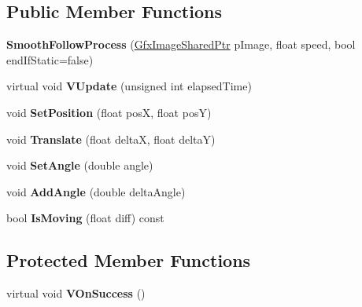 \subsection*{Public Member Functions}
\begin{DoxyCompactItemize}
\item 
\hypertarget{classSmoothFollowProcess_a22d54ebdcc739ba25941fc8c33248fd8}{{\bfseries Smooth\-Follow\-Process} (\hyperlink{GfxImage_8h_a42b2baf6110731a1a358d365e303e086}{Gfx\-Image\-Shared\-Ptr} p\-Image, float speed, bool end\-If\-Static=false)}\label{classSmoothFollowProcess_a22d54ebdcc739ba25941fc8c33248fd8}

\item 
\hypertarget{classSmoothFollowProcess_af9c4972b81034cee88fafc6bd412ef91}{virtual void {\bfseries V\-Update} (unsigned int elapsed\-Time)}\label{classSmoothFollowProcess_af9c4972b81034cee88fafc6bd412ef91}

\item 
\hypertarget{classSmoothFollowProcess_add16c94c5a61db53a26c2b50eab1cc9a}{void {\bfseries Set\-Position} (float pos\-X, float pos\-Y)}\label{classSmoothFollowProcess_add16c94c5a61db53a26c2b50eab1cc9a}

\item 
\hypertarget{classSmoothFollowProcess_ab9668a2efe5c352df938eb9a3217c462}{void {\bfseries Translate} (float delta\-X, float delta\-Y)}\label{classSmoothFollowProcess_ab9668a2efe5c352df938eb9a3217c462}

\item 
\hypertarget{classSmoothFollowProcess_a43294b46e90633a1e6121735c51f4720}{void {\bfseries Set\-Angle} (double angle)}\label{classSmoothFollowProcess_a43294b46e90633a1e6121735c51f4720}

\item 
\hypertarget{classSmoothFollowProcess_a299ca164844c65bc92ec3bd3d270e470}{void {\bfseries Add\-Angle} (double delta\-Angle)}\label{classSmoothFollowProcess_a299ca164844c65bc92ec3bd3d270e470}

\item 
\hypertarget{classSmoothFollowProcess_aabe07b071cd362aa7084340299c5ab0a}{bool {\bfseries Is\-Moving} (float diff) const }\label{classSmoothFollowProcess_aabe07b071cd362aa7084340299c5ab0a}

\end{DoxyCompactItemize}
\subsection*{Protected Member Functions}
\begin{DoxyCompactItemize}
\item 
\hypertarget{classSmoothFollowProcess_abca0e0a5b5c3909f998dcf2b0ade5eed}{virtual void {\bfseries V\-On\-Success} ()}\label{classSmoothFollowProcess_abca0e0a5b5c3909f998dcf2b0ade5eed}

\end{DoxyCompactItemize}


